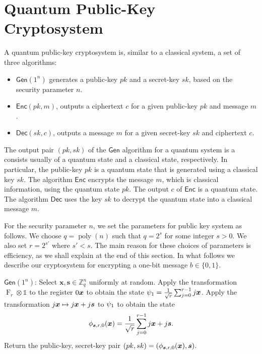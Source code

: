 \documentclass[11pt]{article}
\theoremstyle{plain}
\theoremstyle{definition}
\DeclareMathOperator{\poly}{poly}
\DeclareMathOperator{\qft}{F}
\let\ket\relax
\DeclarePairedDelimiter{\ket}{\lvert}{\rangle}
\def\Z{\mathbb{Z}}
\def\gen{\mathsf{Gen}}
\def\enc{\mathsf{Enc}}
\def\dec{\mathsf{Dec}}
\begin{document}



\section{Quantum Public-Key Cryptosystem}
\label{sec:public-key-enc}

A quantum public-key cryptosystem is, similar to a classical system, a set of three algorithms:
\begin{itemize}[itemsep = 1pt]
\item $\gen(1^n)$ generates a public-key $pk$ and a secret-key $sk$, based on the security parameter $n$.
\item $\enc(pk, m)$, outputs a ciphertext $c$ for a given public-key $pk$ and message $m$.
\item $\dec(sk, c)$, outputs a message $m$ for a given secret-key $sk$ and ciphertext $c$.
\end{itemize}
The output pair $(pk, sk)$ of the $\gen$ algorithm for a quantum system is a consists usually of a quantum state and a classical state, respectively. In particular, the public-key $pk$ is a quantum state that is generated using a classical key $sk$. The algorithm $\enc$ encrypts the message $m$, which is classical information, using the quantum state $pk$. The output $c$ of $\enc$ is a quantum state. The algorithm $\dec$ uses the key $sk$ to decrypt the quantum state into a classical message $m$.

For the security parameter $n$, we set the parameters for public key system as follows. We choose $q = \poly(n)$ such that $q = 2^s$ for some integer $s > 0$. We also set $r = 2^{s'}$ where $s' < s$. The main reason for these choices of parameters is efficiency, as we shall explain at the end of this section. In what follows we describe our cryptosystem for encrypting a one-bit message $b \in \{ 0, 1 \}$.

\vspace*{\topskip}

$\gen(1^n)$: Select $\bm{x}, \bm{s} \in \Z_q^n$ uniformly at random. Apply the transformation $\qft_r \otimes \mathds{1}$ to the register $\ket{0} \ket{\bm{x}}$ to obtain the state $\ket{\psi_1} = \frac{1}{\sqrt{r}} \sum_{j = 0}^{r - 1} \ket{j} \ket{\bm{x}}$. Apply the transformation $\ket{j}\ket{\bm{x}} \mapsto \ket{j}\ket{\bm{x} + j\bm{s}}$ to $\ket{\psi_1}$ to obtain the state
\[ \ket{\phi_{\bm{s}, r, 0}(\bm{x})} = \frac{1}{\sqrt{r}} \sum_{j = 0}^{r - 1} \ket{j} \ket{\bm{x} + j\bm{s}}. \]
Return the public-key, secret-key pair $(pk, sk) = (\ket{\phi_{\bm{s}, r, 0}(\bm{x})}, \bm{s})$.     
\end{document}
